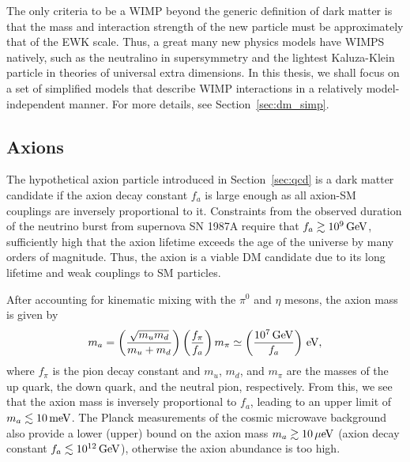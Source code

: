 The only criteria to be a WIMP beyond the generic definition of dark matter is that the mass and interaction strength of the new particle must be approximately that of the EWK scale.
Thus, a great many new physics models have WIMPS natively, such as the neutralino in supersymmetry and the lightest Kaluza-Klein particle in theories of universal extra dimensions.
In this thesis, we shall focus on a set of simplified models that describe WIMP interactions in a relatively model-independent manner.
For more details, see Section~\ref{sec:dm_simp}.

\subsection{Axions}
\label{sec:dm_axion}

The hypothetical axion particle introduced in Section~\ref{sec:qcd} is a dark matter candidate if the axion decay constant $f_a$ is large enough as all axion-SM couplings are inversely proportional to it.
Constraints from the observed duration of the neutrino burst from supernova SN 1987A require that $f_a \gtrsim 10^9\,\text{Ge\hspace{-.08em}V}$, sufficiently high that the axion lifetime exceeds the age of the universe by many orders of magnitude. %
Thus, the axion is a viable DM candidate due to its long lifetime and weak couplings to SM particles.

After accounting for kinematic mixing with the $\pi^0$ and $\eta$ mesons, the axion mass is given by
\begin{equation}
  m_a = \left(\frac{\sqrt{m_u m_d}}{m_u + m_d}\right) \left(\frac{f_\pi}{f_a}\right) m_\pi \simeq \left( \frac{10^7\,\text{Ge\hspace{-.08em}V}}{f_a}\right) \,\text{e\hspace{-.08em}V},
\end{equation}
where $f_\pi$ is the pion decay constant and $m_u$, $m_d$, and $m_\pi$ are the masses of the up quark, the down quark, and the neutral pion, respectively.
From this, we see that the axion mass is inversely proportional to $f_a$, leading to an upper limit of $m_a \lesssim 10 \,\text{me\hspace{-.08em}V}$.
The Planck measurements of the cosmic microwave background also provide a lower (upper) bound on the axion mass $m_a \gtrsim 10 \,\text{\ensuremath{\mu}e\hspace{-.08em}V}$ (axion decay constant $f_a \lesssim 10^{12}\,\text{Ge\hspace{-.08em}V}$), otherwise the axion abundance is too high.

